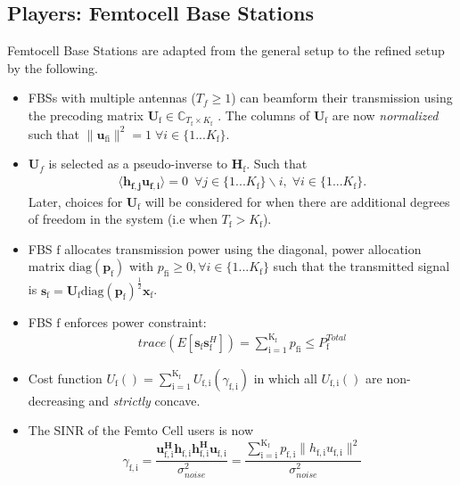 \documentclass[12pt,a4paper]{report}
\begin{document}
\subsection{Players: Femtocell Base Stations}
Femtocell Base Stations are adapted from the general setup to the refined setup by the following.
\begin{itemize}
\item 
	FBSs with multiple antennas ($T_f \geq 1$) can beamform their transmission using the precoding 	
	matrix $\mathbf{U}_{\mathrm{\text{f}}} \in \mathbb{C}_{T_{\text{f}} \times K_{\text{f}}}$ .
	The columns of $\mathbf{U}_{\mathrm{f}}$ are now \emph{normalized} such that 
	 $\|\mathbf{u}_{\mathrm{fi}}\|^2 =1 \;\forall i \in \{1 ... K_{\text{f}}\}$.
\\

\item 
$\mathbf{U}_f$ is selected as a pseudo-inverse to $\mathbf{H_\mathrm{f}}$.
Such that
\begin{gather*}
\langle \mathbf{h_{f,j}}\mathbf{u_{f,i}} \rangle =0\  \; \forall j \in \{1... K_{\text{f}}\}\backslash i ,\; \forall i \in \{1 ... K_{\text{f}}\}.
\end{gather*} Later, choices for $\mathbf{U}_{\text{f}}$ will be considered for when there are additional degrees of freedom in the system (i.e when $T_{\text{f}}> K_{\text{f}}$).

\item  
	FBS $\text{f}$ allocates  transmission power using the diagonal, power allocation  	
	matrix $\mathrm{diag}(\mathbf{p}_{\mathrm{f}})$ with $p_{\mathrm{fi}} \geq 0, \forall i \in \{1 ... K_{\text{f}}\}$
such that the transmitted 		
	signal is 
	$\mathbf{s}_{\mathrm{f}	}= \mathbf{U_{\mathrm{f}}} 
	\mathrm{diag}(\mathbf{p}_{\mathrm{f}})^{\frac{1}{2}}
	\mathbf{x_{\mathrm{f}}}$.
\\
\item 
	FBS $\text{f}$ enforces power constraint:
	\begin{gather*}
	trace(E[\mathbf{s}_\mathrm{f}\mathbf{s}_\mathrm{f}^H]) =
	\sum_{\mathrm{i=1}}^{\mathrm{K_{\mathrm{f}}}} p_{\mathrm{fi}}
	  \leq P^{Total}_{\text{f}} 
	  	\end{gather*}



\item 
	Cost function $U_{\text{f}}() =
	\sum_{\mathrm{i=1}}^{\mathrm{K_{\text{f}}}}
    	U_{\mathrm{f,i}}(\gamma_{\mathrm{f,i}}) $
    	in which all $U_{\mathrm{f,i}}()$ are non-decreasing and
    	\emph{strictly} concave.
\item The SINR of the Femto Cell users is now
\begin{equation}\label{zf_snr}
	\gamma_{\mathrm{f,i}} = 	\frac{\mathbf{u^H_{\mathrm{f,i}}h_{\mathrm{f,i}}h^H_{\mathrm{f,i}}u_{\mathrm{f,i}}}}
	{\sigma^2_{noise}  
	}=\frac{\sum_{\mathrm{i=i}}^{\mathrm{K_{f}}}
 p_{\mathrm{f,i}}\|h_{\mathrm{f,i}}u_{\mathrm{f,i}}\|^2}
	{\sigma^2_{noise}  
	}
	\end{equation}

\end{itemize}
\end{document}

